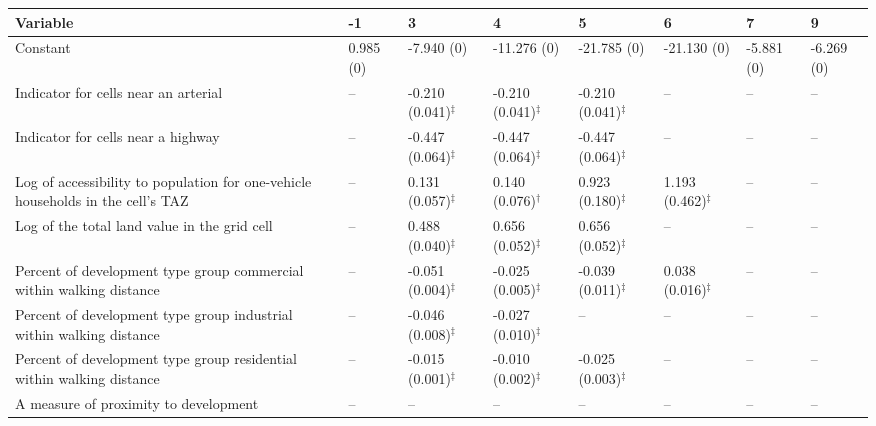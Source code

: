 
\begin{tabular}{p{3in}p{0.5in}p{0.5in}p{0.5in}p{0.5in}p{0.5in}p{0.5in}p{0.5in}}
\hline\hline
Variable & -1 & 3 & 4 & 5 & 6 & 7 & 9 \\\hline
Constant & 0.985 (0) & -7.940 (0) & -11.276 (0) & -21.785 (0) & -21.130 (0) & -5.881 (0) & -6.269 (0) \\
Indicator for cells near an arterial & -- & -0.210 (0.041)$^{\ddagger}$ & -0.210 (0.041)$^{\ddagger}$ & -0.210 (0.041)$^{\ddagger}$ & -- & -- & -- \\
Indicator for cells near a highway & -- & -0.447 (0.064)$^{\ddagger}$ & -0.447 (0.064)$^{\ddagger}$ & -0.447 (0.064)$^{\ddagger}$ & -- & -- & -- \\
Log of accessibility to population for one-vehicle households in the cell's TAZ & -- & 0.131 (0.057)$^{\ddagger}$ & 0.140 (0.076)$^{\dagger}$ & 0.923 (0.180)$^{\ddagger}$ & 1.193 (0.462)$^{\ddagger}$ & -- & -- \\
Log of the total land value in the grid cell & -- & 0.488 (0.040)$^{\ddagger}$ & 0.656 (0.052)$^{\ddagger}$ & 0.656 (0.052)$^{\ddagger}$ & -- & -- & -- \\
Percent of development type group commercial within walking distance & -- & -0.051 (0.004)$^{\ddagger}$ & -0.025 (0.005)$^{\ddagger}$ & -0.039 (0.011)$^{\ddagger}$ & 0.038 (0.016)$^{\ddagger}$ & -- & -- \\
Percent of development type group industrial within walking distance & -- & -0.046 (0.008)$^{\ddagger}$ & -0.027 (0.010)$^{\ddagger}$ & -- & -- & -- & -- \\
Percent of development type group residential within walking distance & -- & -0.015 (0.001)$^{\ddagger}$ & -0.010 (0.002)$^{\ddagger}$ & -0.025 (0.003)$^{\ddagger}$ & -- & -- & -- \\
A measure of proximity to development & -- & -- & -- & -- & -- & -- & -- \\
\hline\hline
\end{tabular}
